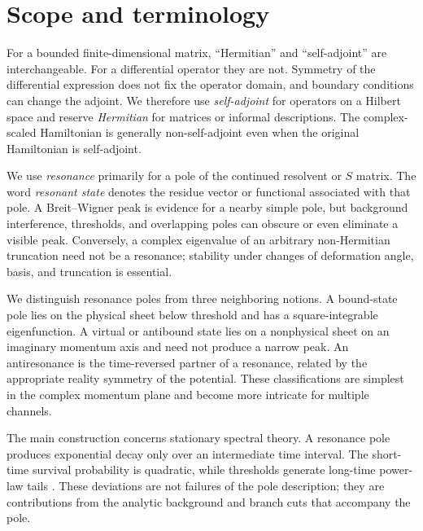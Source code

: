 \section{Scope and terminology}
\label{subsec:scope}

For a bounded finite-dimensional matrix, ``Hermitian'' and ``self-adjoint''
are interchangeable.  For a differential operator they are not.  Symmetry of
the differential expression does not fix the operator domain, and boundary
conditions can change the adjoint.  We therefore use \textit{self-adjoint} for
operators on a Hilbert space and reserve \textit{Hermitian} for matrices or
informal descriptions.  The complex-scaled Hamiltonian is generally
non-self-adjoint even when the original Hamiltonian is self-adjoint.

We use \textit{resonance} primarily for a pole of the continued resolvent or
$S$ matrix.  The word \textit{resonant state} denotes the residue vector or
functional associated with that pole.  A Breit--Wigner peak is evidence for a
nearby simple pole, but background interference, thresholds, and overlapping
poles can obscure or even eliminate a visible peak.  Conversely, a complex
eigenvalue of an arbitrary non-Hermitian truncation need not be a resonance;
stability under changes of deformation angle, basis, and truncation is
essential.

We distinguish resonance poles from three neighboring notions.  A bound-state
pole lies on the physical sheet below threshold and has a square-integrable
eigenfunction.  A virtual or antibound state lies on a nonphysical sheet on an
imaginary momentum axis and need not produce a narrow peak.  An antiresonance
is the time-reversed partner of a resonance, related by the appropriate
reality symmetry of the potential.  These classifications are simplest in the
complex momentum plane and become more intricate for multiple channels.

The main construction concerns stationary spectral theory.  A resonance pole
produces exponential decay only over an intermediate time interval.  The
short-time survival probability is quadratic, while thresholds generate
long-time power-law tails
\cite{GarciaCalderon2017NonExp,Giacosa2012NonExpQFTQM,
Garmon2017NonExpThreshold}.  These deviations are not failures of the pole
description; they are contributions from the analytic background and branch
cuts that accompany the pole.

